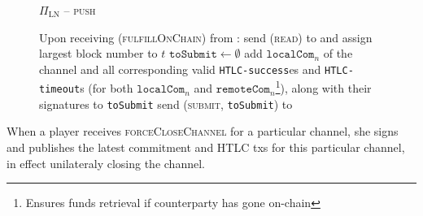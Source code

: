 \begin{figure}[H]
\begin{protocolbox}{$\Pi_{\mathrm{LN}}$ -- \textsc{push}}
\begin{algorithmic}[1]
        \State Upon receiving (\textsc{fulfillOnChain}) from \environment:
        \label{alg:protocol:pay:foc:top}
        \Indent
          \State send (\textsc{read}) to \ledger{} and assign largest block
          number to $t$
          \label{alg:protocol:pay:foc:read}
          \State $\mathtt{toSubmit} \gets \emptyset$
          \label{alg:protocol:pay:foc:tosubmit}
              \State add $\mathtt{localCom}_n$ of the channel and all
              corresponding valid \texttt{HTLC-success}es and
              \texttt{HTLC-timeout}s (for both $\mathtt{localCom}_n$ and
              $\mathtt{remoteCom}_n$\footnote{Ensures funds retrieval if
              counterparty has gone on-chain}), along with their signatures to
              \texttt{toSubmit}
            \EndIf
          \EndFor
          \State send (\textsc{submit}, \texttt{toSubmit}) to \ledger
          \label{alg:protocol:pay:foc:submit}
        \EndIndent
      \end{algorithmic}
    \end{protocolbox}
    \caption{}
    \label{alg:protocol:pay:push}
  \end{figure}

  When a player receives \textsc{forceCloseChannel} for a particular channel,
  she signs and publishes the latest commitment and HTLC txs for this particular
  channel, in effect unilateraly closing the channel.


